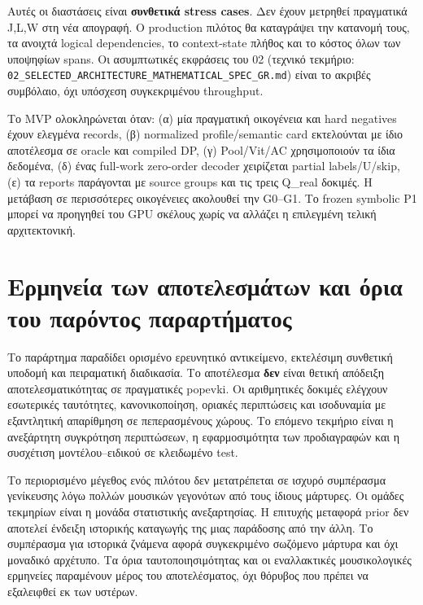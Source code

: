 \documentclass[
  10pt,
  a4paper,
]{report}
\begin{document}
Αυτές οι διαστάσεις είναι \textbf{συνθετικά stress cases}. Δεν έχουν
μετρηθεί πραγματικά J,L,W στη νέα απογραφή. Ο production πιλότος θα
καταγράψει την κατανομή τους, τα ανοιχτά logical dependencies, το
context-state πλήθος και το κόστος όλων των υποψηφίων spans. Οι
ασυμπτωτικές εκφράσεις του 02 (τεχνικό τεκμήριο:
\texttt{02\_SELECTED\_ARCHITECTURE\_MATHEMATICAL\_SPEC\_GR.md}) είναι το
ακριβές συμβόλαιο, όχι υπόσχεση συγκεκριμένου throughput.

Το MVP ολοκληρώνεται όταν: (α) μία πραγματική οικογένεια και hard
negatives έχουν ελεγμένα records, (β) normalized profile/semantic card
εκτελούνται με ίδιο αποτέλεσμα σε oracle και compiled DP, (γ)
Pool/Vit/AC χρησιμοποιούν τα ίδια δεδομένα, (δ) ένας full-work
zero-order decoder χειρίζεται partial labels/U/skip, (ε) τα reports
παράγονται με source groups και τις τρεις Q\_real δοκιμές. Η μετάβαση σε
περισσότερες οικογένειες ακολουθεί την G0--G1. Το frozen symbolic P1
μπορεί να προηγηθεί του GPU σκέλους χωρίς να αλλάζει η επιλεγμένη τελική
αρχιτεκτονική.

\chapter{Ερμηνεία των αποτελεσμάτων και όρια του παρόντος
παραρτήματος}\label{ux3b5ux3c1ux3bcux3b7ux3bdux3b5ux3afux3b1-ux3c4ux3c9ux3bd-ux3b1ux3c0ux3bfux3c4ux3b5ux3bbux3b5ux3c3ux3bcux3acux3c4ux3c9ux3bd-ux3baux3b1ux3b9-ux3ccux3c1ux3b9ux3b1-ux3c4ux3bfux3c5-ux3c0ux3b1ux3c1ux3ccux3bdux3c4ux3bfux3c2-ux3c0ux3b1ux3c1ux3b1ux3c1ux3c4ux3aeux3bcux3b1ux3c4ux3bfux3c2}

Το παράρτημα παραδίδει ορισμένο ερευνητικό αντικείμενο, εκτελέσιμη
συνθετική υποδομή και πειραματική διαδικασία. Το αποτέλεσμα \textbf{δεν}
είναι θετική απόδειξη αποτελεσματικότητας σε πραγματικές popevki. Οι
αριθμητικές δοκιμές ελέγχουν εσωτερικές ταυτότητες, κανονικοποίηση,
οριακές περιπτώσεις και ισοδυναμία με εξαντλητική απαρίθμηση σε
πεπερασμένους χώρους. Το επόμενο τεκμήριο είναι η ανεξάρτητη συγκρότηση
περιπτώσεων, η εφαρμοσιμότητα των προδιαγραφών και η συσχέτιση
μοντέλου--ειδικού σε κλειδωμένο test.

Το περιορισμένο μέγεθος ενός πιλότου δεν μετατρέπεται σε ισχυρό
συμπέρασμα γενίκευσης λόγω πολλών μουσικών γεγονότων από τους ίδιους
μάρτυρες. Οι ομάδες τεκμηρίων είναι η μονάδα στατιστικής ανεξαρτησίας. Η
επιτυχής μεταφορά prior δεν αποτελεί ένδειξη ιστορικής καταγωγής της
μιας παράδοσης από την άλλη. Το συμπέρασμα για ιστορικά ζνάμενα αφορά
συγκεκριμένο σωζόμενο μάρτυρα και όχι μοναδικό αρχέτυπο. Τα όρια
ταυτοποιησιμότητας και οι εναλλακτικές μουσικολογικές ερμηνείες
παραμένουν μέρος του αποτελέσματος, όχι θόρυβος που πρέπει να εξαλειφθεί
εκ των υστέρων.
\end{document}
